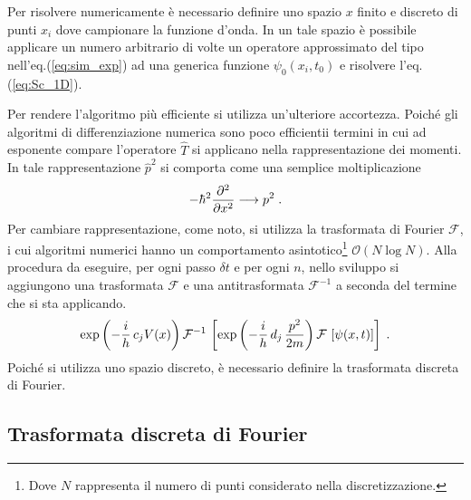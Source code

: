 \documentclass[12pt]{report}
\begin{document}
Per risolvere numericamente è necessario definire uno spazio $x$ finito e discreto di punti ${x_i}$ dove campionare la funzione d'onda. In un tale spazio è possibile applicare un numero arbitrario di volte un operatore approssimato del tipo nell'eq.(\ref{eq:sim_exp}) ad una generica funzione $\psi_{0}(x_i,t_{0})$ e risolvere l'eq.(\ref{eq:Sc_1D}).

Per rendere l'algoritmo più efficiente si utilizza un'ulteriore accortezza. 
Poiché gli algoritmi di differenziazione numerica sono poco efficientii termini in cui ad esponente compare l'operatore $\hat{T}$ si applicano nella rappresentazione dei momenti. In tale rappresentazione $\hat{p}^2$ si comporta come una semplice moltiplicazione 
\begin{equation}
    \centering
    - \hbar^2 \frac{\partial^{2}}{\partial x^{2}} \longrightarrow p^{2} \; \text{.}
    \label{eq:p^2}
\end{equation}
Per cambiare rappresentazione, come noto, si utilizza la trasformata di Fourier $\mathcal{F}$, i cui algoritmi numerici hanno un comportamento asintotico\footnote{Dove $N$ rappresenta il numero di punti considerato nella discretizzazione.} $\mathcal{O}(N \log N)$. Alla procedura da eseguire, per ogni passo $\delta t$ e per ogni $n$, nello sviluppo si aggiungono una trasformata $\mathcal{F}$ e una antitrasformata $\mathcal{F}^{-1}$ a seconda del termine che si sta applicando.
\begin{equation}
    \centering
     \exp \left(- \frac{i}{h} \, c_{j} V(x)\right) \mathcal{F}^{-1} \, \left[  \exp \left(- \frac{i}{h} \, d_{j} \, \frac{p^2}{2m} \right) \mathcal{F} \, \left[  \psi(x, t) \right] \right] \; \text{.}
    \label{eq:trasf_anti}
\end{equation}
Poiché si utilizza uno spazio discreto, è necessario definire la trasformata discreta di Fourier.

\subsection{Trasformata discreta di Fourier}
\label{sec:DFT}
\end{document}
